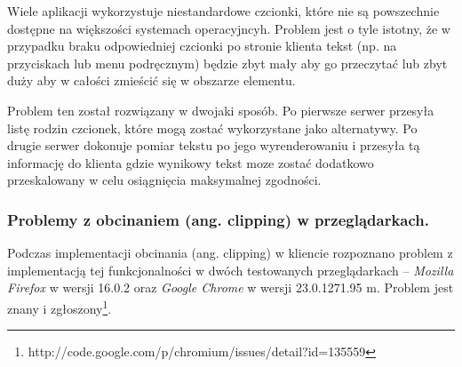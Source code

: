 Wiele aplikacji wykorzystuje niestandardowe czcionki, które nie są powszechnie dostępne na większości systemach operacyjncyh. Problem jest o tyle istotny, że w przypadku braku odpowiedniej czcionki po stronie klienta tekst (np. na przyciskach lub menu podręcznym) będzie zbyt mały aby go przeczytać lub zbyt duży aby w całości zmieścić się w obszarze elementu. 

Problem ten został rozwiązany w dwojaki sposób. Po pierwsze serwer przesyła listę rodzin czcionek, które mogą zostać wykorzystane jako alternatywy. Po drugie serwer dokonuje pomiar tekstu po jego wyrenderowaniu i przesyła tą informację do klienta gdzie wynikowy tekst moze zostać dodatkowo przeskalowany w celu osiągnięcia maksymalnej zgodności.

\subsubsection{Problemy z obcinaniem (ang. clipping) w przeglądarkach.}
\label{problems_clipping}
Podczas implementacji obcinania (ang. clipping) w kliencie rozpoznano problem z implementacją tej funkcjonalności w dwóch testowanych przeglądarkach -- \emph{Mozilla Firefox} w wersji 16.0.2 oraz \emph{Google Chrome} w wersji 23.0.1271.95 m. Problem jest znany i zgłoszony\footnote{http://code.google.com/p/chromium/issues/detail?id=135559}.
